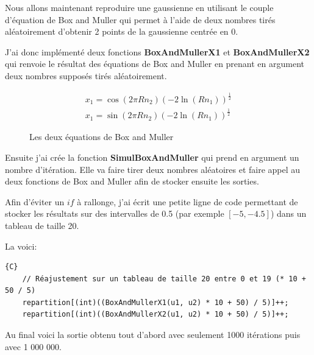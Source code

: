 \documentclass[12pt,french]{article} %
\begin{document}
Nous allons maintenant reproduire une gaussienne en utilisant le couple d'équation de Box and Muller qui permet à l'aide de deux nombres tirés aléatoirement d'obtenir 2 points de la gaussienne centrée en 0.

J'ai donc implémenté deux fonctions \textbf{BoxAndMullerX1} et \textbf{BoxAndMullerX2} qui renvoie le résultat des équations de Box and Muller en prenant en argument deux nombres supposés tirés aléatoirement.

\begin{figure}[H]
	\centering
	\begin{align}
		x_{1} = \cos(2 \pi Rn_{2})(-2 \ln(Rn_{1}))^{\frac{1}{2}} \\
		x_{1} = \sin(2 \pi Rn_{2})(-2 \ln(Rn_{1}))^{\frac{1}{2}}
	\end{align}
	\caption{Les deux équations de Box and Muller}    
\end{figure}

Ensuite j'ai crée la fonction \textbf{SimulBoxAndMuller} qui prend en argument un nombre d'itération. Elle va faire tirer deux nombres aléatoires et faire appel au deux fonctions de Box and Muller afin de stocker ensuite les sorties.

Afin d'éviter un $if$ à rallonge, j'ai écrit une petite ligne de code permettant de stocker les résultats sur des intervalles de 0.5 (par exemple $[-5 , -4.5]$) dans un tableau de taille 20.

La voici:

\begin{lstlisting}{C}
	// Réajustement sur un tableau de taille 20 entre 0 et 19 (* 10 + 50 / 5)
	repartition[(int)((BoxAndMullerX1(u1, u2) * 10 + 50) / 5)]++;
	repartition[(int)((BoxAndMullerX2(u1, u2) * 10 + 50) / 5)]++;
\end{lstlisting}

\bigskip

Au final voici la sortie obtenu tout d'abord avec seulement 1000 itérations puis avec 1 000 000.
\end{document}
